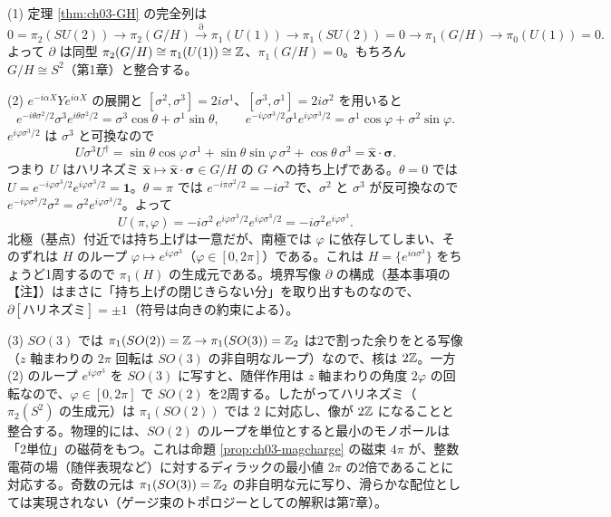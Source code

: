 \begin{solution}
(1) 定理 \ref{thm:ch03-GH} の完全列は
\[
0=\pi_2(SU(2))\to\pi_2(G/H)\xrightarrow{\partial}\pi_1(U(1))\to\pi_1(SU(2))=0\to\pi_1(G/H)\to\pi_0(U(1))=0 .
\]
よって $\partial$ は同型 $\pi_2(G/H)\cong\pi_1(U(1))\cong\mathbb{Z}$、$\pi_1(G/H)=0$。もちろん $G/H\cong S^2$（第1章）と整合する。

(2) $e^{-i\alpha X}Ye^{i\alpha X}$ の展開と $[\sigma^2,\sigma^3]=2i\sigma^1$、$[\sigma^3,\sigma^1]=2i\sigma^2$ を用いると
\[
e^{-i\theta\sigma^2/2}\sigma^3e^{i\theta\sigma^2/2}=\sigma^3\cos\theta+\sigma^1\sin\theta,\qquad e^{-i\varphi\sigma^3/2}\sigma^1e^{i\varphi\sigma^3/2}=\sigma^1\cos\varphi+\sigma^2\sin\varphi .
\]
$e^{i\varphi\sigma^3/2}$ は $\sigma^3$ と可換なので
\[
U\sigma^3U^\dagger=\sin\theta\cos\varphi\,\sigma^1+\sin\theta\sin\varphi\,\sigma^2+\cos\theta\,\sigma^3=\hat{\bm x}\cdot\bm\sigma .
\]
つまり $U$ はハリネズミ $\hat{\bm x}\mapsto\hat{\bm x}\cdot\bm\sigma\in G/H$ の $G$ への持ち上げである。$\theta=0$ では $U=e^{-i\varphi\sigma^3/2}e^{i\varphi\sigma^3/2}=\mathbf 1$。$\theta=\pi$ では $e^{-i\pi\sigma^2/2}=-i\sigma^2$ で、$\sigma^2$ と $\sigma^3$ が反可換なので $e^{-i\varphi\sigma^3/2}\sigma^2=\sigma^2e^{i\varphi\sigma^3/2}$。よって
\[
U(\pi,\varphi)=-i\sigma^2\,e^{i\varphi\sigma^3/2}e^{i\varphi\sigma^3/2}=-i\sigma^2e^{i\varphi\sigma^3}.
\]
北極（基点）付近では持ち上げは一意だが、南極では $\varphi$ に依存してしまい、そのずれは $H$ のループ $\varphi\mapsto e^{i\varphi\sigma^3}$（$\varphi\in[0,2\pi]$）である。これは $H=\{e^{i\alpha\sigma^3}\}$ をちょうど1周するので $\pi_1(H)$ の生成元である。境界写像 $\partial$ の構成（基本事項の【注】）はまさに「持ち上げの閉じきらない分」を取り出すものなので、$\partial[\text{ハリネズミ}]=\pm1$（符号は向きの約束による）。

(3) $SO(3)$ では $\pi_1(SO(2))=\mathbb{Z}\to\pi_1(SO(3))=\mathbb{Z}_2$ は2で割った余りをとる写像（$z$ 軸まわりの $2\pi$ 回転は $SO(3)$ の非自明なループ）なので、核は $2\mathbb{Z}$。一方 (2) のループ $e^{i\varphi\sigma^3}$ を $SO(3)$ に写すと、随伴作用は $z$ 軸まわりの角度 $2\varphi$ の回転なので、$\varphi\in[0,2\pi]$ で $SO(2)$ を2周する。したがってハリネズミ（$\pi_2(S^2)$ の生成元）は $\pi_1(SO(2))$ では $2$ に対応し、像が $2\mathbb{Z}$ になることと整合する。物理的には、$SO(2)$ のループを単位とすると最小のモノポールは「2単位」の磁荷をもつ。これは命題 \ref{prop:ch03-magcharge} の磁束 $4\pi$ が、整数電荷の場（随伴表現など）に対するディラックの最小値 $2\pi$ の2倍であることに対応する。奇数の元は $\pi_1(SO(3))=\mathbb{Z}_2$ の非自明な元に写り、滑らかな配位としては実現されない（ゲージ束のトポロジーとしての解釈は第7章）。
\end{solution}

